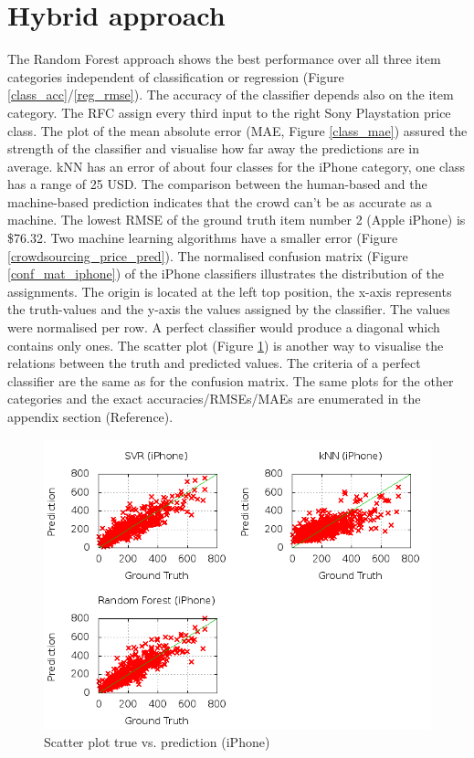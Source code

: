 \section{Hybrid approach}
The Random Forest approach shows the best performance over all three item categories independent of classification or regression (Figure \ref{class_acc}/\ref{reg_rmse}). The accuracy of the classifier depends also on the item category. The RFC assign every third input to the right Sony Playstation price class. The plot of the mean absolute error (MAE, Figure \ref{class_mae}) assured the strength of the classifier and visualise how far away the predictions are in average. kNN has an error of about four classes for the iPhone category, one class has a range of 25 USD. The comparison between the human-based and the machine-based prediction indicates that the crowd can't be as accurate as a machine. The lowest RMSE of the ground truth item number 2 (Apple iPhone) is \$76.32. Two machine learning algorithms have a smaller error (Figure \ref{crowdsourcing_price_pred}). 
The normalised confusion matrix (Figure \ref{conf_mat_iphone}) of the iPhone classifiers illustrates the distribution of the assignments. The origin is located at the left top position, the x-axis represents the truth-values and the y-axis the values assigned by the classifier. The values were normalised per row. A perfect classifier would produce a diagonal which contains only ones. 
The scatter plot (Figure \ref{true_predict_iphone}) is another way to visualise the relations between the truth and predicted values. The criteria of a perfect classifier are the same as for the confusion matrix. 
The same plots for the other categories and the exact accuracies/RMSEs/MAEs are enumerated in the appendix section (Reference).
\begin{figure}
\centering
\includegraphics[scale=0.55]{images/plots/machine_learning/iphone/true_pred_iphone.png}
\caption{Scatter plot true vs. prediction (iPhone)}
\label{true_predict_iphone}
\end{figure}
